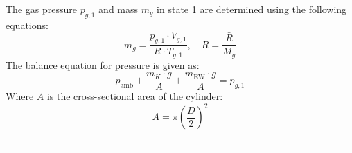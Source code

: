 The gas pressure \( p_{g,1} \) and mass \( m_g \) in state 1 are determined using the following equations:  
\[
m_g = \frac{p_{g,1} \cdot V_{g,1}}{R \cdot T_{g,1}}, \quad R = \frac{\bar{R}}{M_g}
\]  
The balance equation for pressure is given as:  
\[
p_{\text{amb}} + \frac{m_K \cdot g}{A} + \frac{m_{\text{EW}} \cdot g}{A} = p_{g,1}
\]  
Where \( A \) is the cross-sectional area of the cylinder:  
\[
A = \pi \left(\frac{D}{2}\right)^2
\]  

---